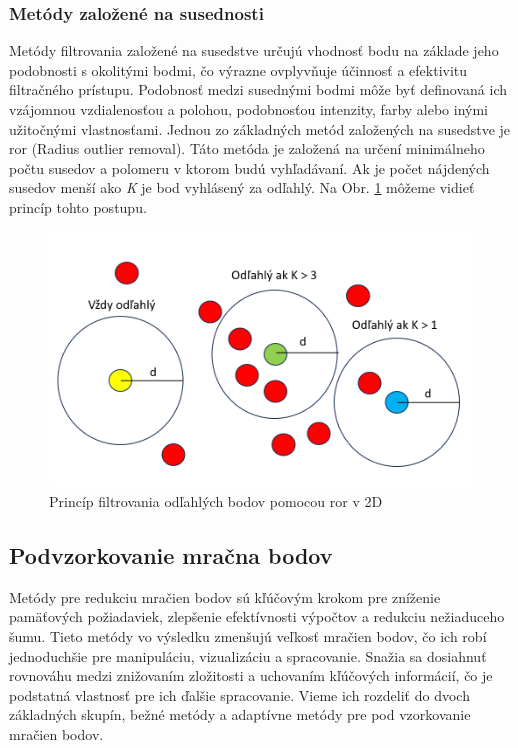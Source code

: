 \subsubsection{Metódy založené na susednosti} \label{section::ror}
\noindent Metódy filtrovania založené na susedstve určujú vhodnosť bodu na základe jeho podobnosti s okolitými bodmi, čo výrazne ovplyvňuje účinnosť a efektivitu filtračného prístupu. Podobnosť medzi susednými bodmi môže byť definovaná ich vzájomnou vzdialenosťou a polohou, podobnosťou intenzity, farby alebo inými užitočnými vlastnosťami. \cite{point_cloud_filtering}
\newline\indent Jednou zo základných metód založených na susedstve je \acrshort{ror} (Radius outlier removal). Táto metóda je založená na určení minimálneho počtu susedov a polomeru v ktorom budú vyhľadávaní. Ak je počet nájdených susedov menší ako \textit{K} je bod vyhlásený za odľahlý. Na Obr. \ref{ror_principal} môžeme vidieť princíp tohto postupu.
\begin{figure}[!htbp]
  \centering
  \includegraphics[width=12cm]{img/ros_principal.png}
  \caption{Princíp filtrovania odľahlých bodov pomocou \acrshort{ror} v 2D}
  \label{ror_principal}
\end{figure}

\newpage\subsection{Podvzorkovanie mračna bodov}
\noindent Metódy pre redukciu mračien bodov sú kľúčovým krokom pre zníženie pamäťových požiadaviek, zlepšenie efektívnosti výpočtov a redukciu nežiaduceho šumu. Tieto metódy vo výsledku zmenšujú veľkosť mračien bodov, čo ich robí jednoduchšie pre manipuláciu, vizualizáciu a spracovanie. Snažia  sa dosiahnuť rovnováhu medzi znižovaním zložitosti a uchovaním kľúčových informácií, čo je podstatná vlastnosť pre ich ďalšie spracovanie. Vieme ich rozdeliť do dvoch základných skupín, bežné metódy a adaptívne metódy pre pod vzorkovanie mračien bodov.

